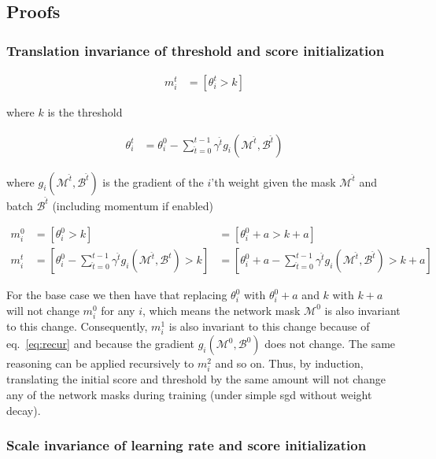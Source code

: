 \documentclass{article}
\begin{document}
    \subsection{Proofs}

    \subsubsection{Translation invariance of threshold and score initialization}\label{proof:translation_invariance}

    \begin{align}
        m_i^t &= [\theta_i^t > k]
    \end{align}

    where $k$ is the threshold

    \begin{align}
        \theta_i^{t} &= \theta_i^0 - \sum_{\hat t=0}^{t-1} \gamma^{\hat t} g_{i}(\mathcal{M}^{\hat t}, \mathcal{B}^{\hat t})
    \end{align}

    where $g_{i}(\mathcal{M}^{\hat t}, \mathcal{B}^{\hat t})$ is the gradient of the $i$'th weight given the mask $\mathcal{M}^{\hat t}$ and batch $\mathcal{B}^{\hat t}$ (including momentum if enabled)

    \begin{align}
        m_i^0 &= [\theta_i^0 > k] &= [\theta_i^0 + a > k + a] \\
        m_i^{t} &= [\theta_i^0 - \sum_{\hat t=0}^{t-1} \gamma^{\hat t} g_{i}(\mathcal{M}^{\hat t}, \mathcal{B}^{\hat t}) > k] &= [\theta_i^0 + a - \sum_{\hat t=0}^{t-1} \gamma^{\hat t} g_{i}(\mathcal{M}^{\hat t}, \mathcal{B}^{\hat t}) > k + a]\label{eq:recur}
    \end{align}

    For the base case we then have that replacing $\theta_i^0$ with $\theta_i^0 + a$ and $k$ with $k+a$ will not change $m_i^0$ for any $i$, which means the network mask $\mathcal{M}^0$ is also invariant to this change.
    Consequently, $m_i^1$ is also invariant to this change because of eq.~\ref{eq:recur} and because the gradient $g_i(\mathcal{M}^0, \mathcal{B}^0)$ does not change. The same reasoning can be applied recursively to $m_i^2$ and so on. Thus, by induction, translating the initial score and threshold by the same amount will not change any of the network masks during training (under simple sgd without weight decay).

    \subsubsection{Scale invariance of learning rate and score initialization}\label{proof:scale_invariance}
\end{document}
